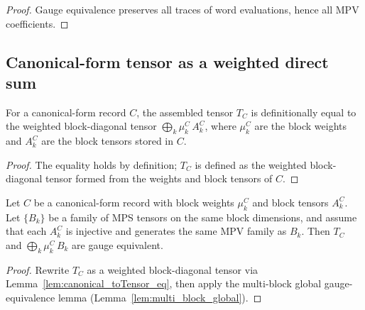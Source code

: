 \begin{proof}\leanok
    Gauge equivalence preserves all traces of word evaluations, hence all
    MPV coefficients.
\end{proof}

\subsection{Canonical-form tensor as a weighted direct sum}%
\label{subsec:canonical_form_block_sum}

\begin{lemma}\label{lem:canonical_toTensor_eq}
    \leanok
    For a canonical-form record $C$, the assembled tensor $T_C$ is
    definitionally equal to the weighted block-diagonal tensor
    $\bigoplus_k \mu_k^C\, A_k^C$,
    where $\mu_k^C$ are the block weights and $A_k^C$ are the block tensors
    stored in $C$.
\end{lemma}

\begin{proof}\leanok
    The equality holds by definition; $T_C$ is defined as the weighted
    block-diagonal tensor formed from the weights and block tensors of $C$.
\end{proof}

\begin{theorem}\label{thm:ft_canonical_form_same_structure}
    \leanok
    Let $C$ be a canonical-form record with block weights $\mu_k^C$ and block
    tensors $A_k^C$. Let $\{B_k\}$ be a family of MPS tensors on the same
    block dimensions, and assume that each $A_k^C$ is injective and generates
    the same MPV family as $B_k$.
    Then $T_C$ and $\bigoplus_k \mu_k^C\, B_k$ are gauge equivalent.
\end{theorem}

\begin{proof}\leanok
    Rewrite $T_C$ as a weighted block-diagonal tensor via
    Lemma~\ref{lem:canonical_toTensor_eq}, then apply the multi-block
    global gauge-equivalence lemma
    (Lemma~\ref{lem:multi_block_global}).
\end{proof}

